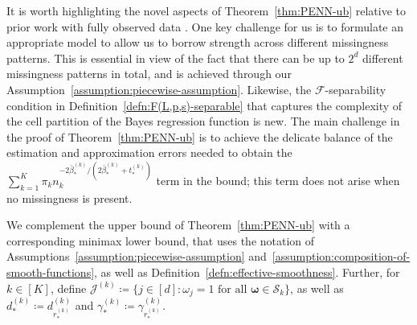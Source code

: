 \documentclass[12pt]{article}
\begin{document}
It is worth highlighting the novel aspects of Theorem~\ref{thm:PENN-ub} relative to prior work with fully observed data \citep[e.g.][]{schmidt-hieber2020nonparametric,kohler2021rate}.  One key challenge for us is to formulate an appropriate model to allow us to borrow strength across different missingness patterns.  This is essential in view of the fact that there can be up to $2^d$ different missingness patterns in total, and is achieved through our Assumption~\ref{assumption:piecewise-assumption}.  Likewise, the $\mathcal{F}$-separability condition in Definition~\ref{defn:F(L,p,s)-separable} that captures the complexity of the cell partition of the Bayes regression function is new.  The main challenge in the proof of Theorem~\ref{thm:PENN-ub} is to achieve the delicate balance of the  estimation and approximation errors needed to obtain the $\sum_{k=1}^K \pi_k n_k^{-2\bar{\beta}_*^{(k)}/(2\bar{\beta}_*^{(k)} + t_*^{(k)})}$ term in the bound; this term does not arise when no missingness is present.

We complement the upper bound of Theorem~\ref{thm:PENN-ub} with a corresponding minimax lower bound, that uses the notation of Assumptions~\ref{assumption:piecewise-assumption} and~\ref{assumption:composition-of-smooth-functions}, as well as Definition~\ref{defn:effective-smoothness}. Further, for $k\in[K]$, define $\mathcal{J}^{(k)} \coloneqq \{j\in[d] : \omega_j = 1 \text{ for all } \bm\omega \in \mathcal{S}_k\}$, as well as $d_*^{(k)} \coloneqq d_{r_*^{(k)}}^{(k)}$ and $\gamma_*^{(k)} \coloneqq \gamma^{(k)}_{r_*^{(k)}}$. 
\end{document}
